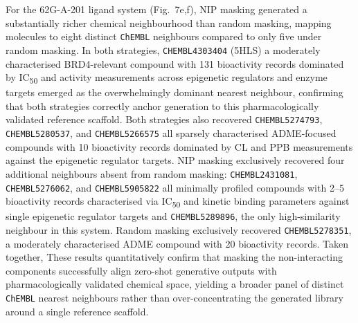 \documentclass[a4paper,12pt]{article}
\begin{document}
For the 62G-A-201 ligand system (Fig.~7e,f), NIP masking generated a substantially 
richer chemical neighbourhood than random masking, mapping molecules to 
eight distinct \texttt{ChEMBL} neighbours compared to only five under 
random masking. In both strategies, \texttt{CHEMBL4303404} (5HLS) a 
moderately characterised BRD4-relevant compound with 131 bioactivity 
records dominated by IC\textsubscript{50} and activity measurements 
across epigenetic regulators and enzyme targets  emerged as the 
overwhelmingly dominant nearest neighbour, confirming that both 
strategies correctly anchor generation to this pharmacologically 
validated reference scaffold. Both strategies also recovered 
\texttt{CHEMBL5274793}, \texttt{CHEMBL5280537}, and \texttt{CHEMBL5266575} 
  all sparsely characterised ADME-focused compounds with 10 bioactivity 
records dominated by CL and PPB measurements against the epigenetic regulator 
targets. NIP masking exclusively recovered four additional neighbours 
absent from random masking: \texttt{CHEMBL2431081}, \texttt{CHEMBL5276062}, 
and \texttt{CHEMBL5905822} all minimally profiled compounds with 2--5 
bioactivity records characterised via IC\textsubscript{50} and kinetic 
binding parameters against single epigenetic regulator targets and 
\texttt{CHEMBL5289896}, the only high-similarity neighbour in this system. 
Random masking exclusively recovered \texttt{CHEMBL5278351}, a moderately 
characterised ADME compound with 20 bioactivity records. Taken together, 
These results quantitatively confirm that masking the non-interacting 
components successfully align zero-shot generative outputs with 
pharmacologically validated chemical space, yielding a broader panel of 
distinct \texttt{ChEMBL} nearest neighbours rather than over-concentrating the generated library around a single reference scaffold. 
\end{document}
